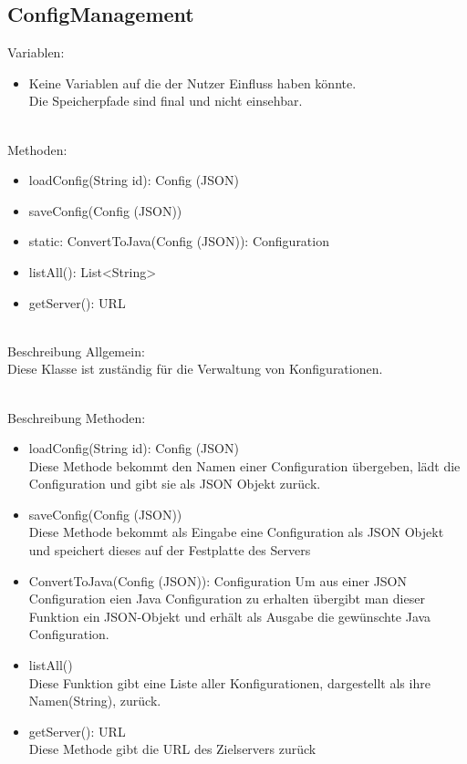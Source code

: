 
\subsection{ConfigManagement}
Variablen:
\begin{itemize}
	\item Keine Variablen auf die der Nutzer Einfluss haben könnte.\\
		Die Speicherpfade sind final und nicht einsehbar.
		
\end{itemize}
\ \\
Methoden:
\begin{itemize}
	\item loadConfig(String id): Config (JSON)
	\item saveConfig(Config (JSON))
	\item static: ConvertToJava(Config (JSON)): Configuration
	\item listAll(): List<String>
	\item getServer(): URL
\end{itemize}
\ \\
Beschreibung Allgemein:\\
Diese Klasse ist zuständig für die Verwaltung von Konfigurationen.

\ \\
Beschreibung Methoden:\\
\begin{itemize}
	\item loadConfig(String id): Config (JSON) \\
	Diese Methode bekommt den Namen einer Configuration übergeben, lädt die Configuration und gibt sie als JSON Objekt zurück.
	
	\item saveConfig(Config (JSON))\\
	Diese Methode bekommt als Eingabe eine Configuration als JSON Objekt
	und speichert dieses auf der Festplatte des Servers
	
	\item ConvertToJava(Config (JSON)): Configuration
	Um aus einer JSON Configuration eien Java Configuration zu erhalten übergibt man dieser Funktion ein JSON-Objekt und erhält als Ausgabe die gewünschte Java Configuration.
	
	\item listAll() \\
	Diese Funktion gibt eine Liste aller Konfigurationen, dargestellt als ihre Namen(String), zurück.
	
	\item getServer(): URL\\
	Diese Methode gibt die URL des Zielservers zurück 
\end{itemize}

